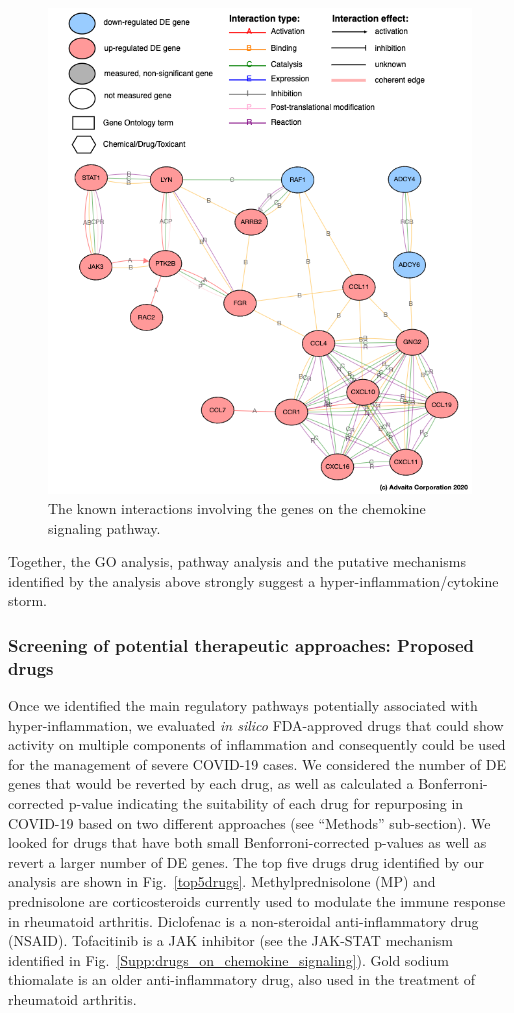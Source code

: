 \begin{figure}
\centering
	\includegraphics[width=0.8\linewidth]{../Figures/chemokine_signaling_mechanism.png}
    \caption{The known interactions involving the genes on the chemokine signaling pathway. }
        \label{Supp:chemokine_signaling_mechanism}
\end{figure}


Together, the GO analysis, pathway analysis and the putative mechanisms identified by the analysis above strongly  suggest a hyper-inflammation/cytokine storm.
\color{black} 


\subsubsection{Screening of potential therapeutic approaches: Proposed drugs}  

Once we identified the main regulatory pathways potentially associated with hyper-inflammation, we evaluated \emph{in silico} FDA-approved drugs that could show activity on multiple components of inflammation and consequently could be used for the management of severe COVID-19 cases. We considered the number of DE genes that would be reverted by each drug, as well as calculated a Bonferroni-corrected p-value indicating the suitability of each drug for repurposing in COVID-19 based on two different approaches (see ``Methods'' sub-section). We looked for drugs that have both small Benforroni-corrected p-values as well as revert a larger number of DE genes. 
The top five drugs drug identified by our analysis are shown in Fig.~\ref{top5drugs}. Methylprednisolone (MP) and prednisolone are corticosteroids currently used to modulate the immune response in rheumatoid arthritis.  Diclofenac is a non-steroidal anti-inflammatory drug (NSAID). Tofacitinib is a JAK inhibitor (see the JAK-STAT mechanism identified in  Fig.~\ref{Supp:drugs_on_chemokine_signaling}). Gold sodium thiomalate is an older anti-inflammatory drug, also used in the treatment of rheumatoid arthritis. 



